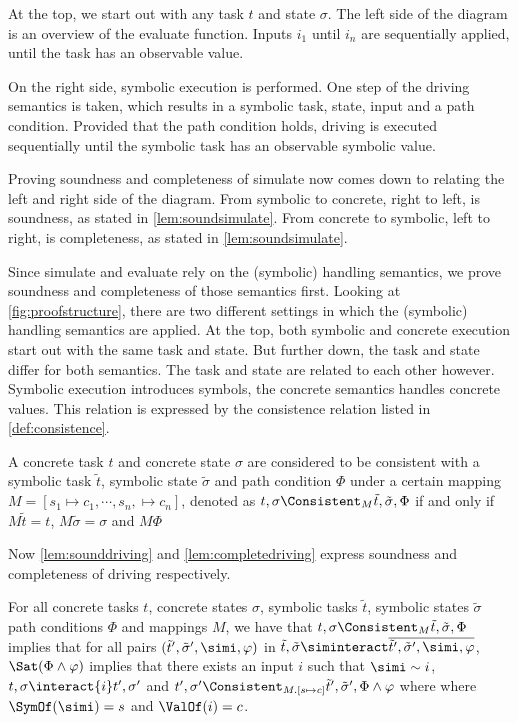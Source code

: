 At the top, we start out with any task $t$ and state $\sigma$.
The left side of the diagram is an overview of the evaluate function.
Inputs $i_1$ until $i_n$ are sequentially applied, until the task has an observable value.

On the right side, symbolic execution is performed.
One step of the driving semantics is taken, which results in a symbolic task, state, input
and a path condition.
Provided that the path condition holds, driving is executed sequentially until the symbolic task has an observable symbolic value.

Proving soundness and completeness of simulate now comes down to relating the left and right side of the diagram.
From symbolic to concrete, right to left, is soundness, as stated in \cref{lem:soundsimulate}.
From concrete to symbolic, left to right, is completeness, as stated in \cref{lem:soundsimulate}.

Since simulate and evaluate rely on the (symbolic) handling semantics,
we prove soundness and completeness of those semantics first.
Looking at \cref{fig:proofstructure}, there are two different settings in which the (symbolic) handling semantics are applied.
At the top, both symbolic and concrete execution start out with the same task and state.
But further down, the task and state differ for both semantics.
The task and state are related to each other however.
Symbolic execution introduces symbols, the concrete semantics handles concrete values.
This relation is expressed by the consistence relation listed in \cref{def:consistence}.

\begin{definition}
  \label{def:consistence}
A concrete task $t$ and concrete state $\sigma$
are considered to be consistent with a symbolic task $\tilde{t}$, symbolic state $\tilde{\sigma}$ and path condition $\Phi$
under a certain mapping $M=[s_1\mapsto c_1,\cdots,s_n,\mapsto c_n]$, denoted as $t,\sigma \Consistent_M \tilde{t},\tilde{\sigma},\Phi$
if and only if $M\tilde{t}=t$, $M\tilde{\sigma}=\sigma$ and $M\Phi$
\end{definition}

Now \cref{lem:sounddriving} and \cref{lem:completedriving} express soundness and completeness of driving respectively.

\begin{lemma}
  \label{lem:sounddriving}
  For all concrete tasks $t$, concrete states $\sigma$, symbolic tasks $\tilde{t}$, symbolic states $\tilde{\sigma}$ path conditions $\Phi$ and mappings $M$,
  we have that $t,\sigma\Consistent_M\tilde{t},\tilde{\sigma},\Phi$ implies
  that for all pairs $(\tilde{t}',\tilde{\sigma}',\simi,\phi)$ in $\tilde{t},\tilde{\sigma}\siminteract\overline{\tilde{t}',\tilde{\sigma}',\simi,\phi}$,
  $\Sat(\Phi\land\phi)$ implies that there exists an input $i$ such that $\simi\sim i$,  $t,\sigma\interact{i}t',\sigma'$ and $t',\sigma' \Consistent_{M.[s\mapsto c]} \tilde{t}',\tilde{\sigma}',\Phi\land\phi$ where where $\SymOf(\simi)=s$ and $\ValOf(i)=c$.
\end{lemma}

